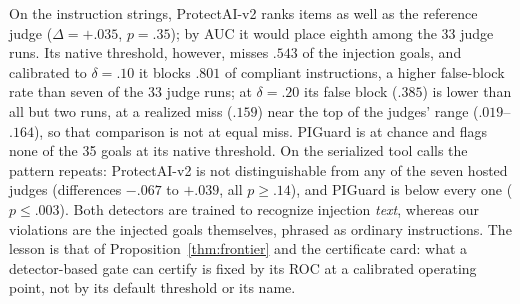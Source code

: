 On the instruction strings, ProtectAI-v2 ranks items as well as the reference judge
($\Delta=+.035$, $p=.35$); by AUC it would place eighth among the 33 judge runs. Its native
threshold, however, misses $.543$ of the injection goals, and calibrated to $\delta=.10$ it
blocks $.801$ of compliant instructions, a higher false-block rate than seven of the 33 judge runs; at $\delta=.20$ its
false block ($.385$) is lower than all but two runs, at a realized miss ($.159$) near the top of
the judges' range ($.019$--$.164$), so that comparison is not at equal miss. PIGuard is at chance
and flags none of the 35 goals at its native threshold. On the serialized tool calls the pattern
repeats: ProtectAI-v2 is not distinguishable from any of the seven hosted judges (differences
$-.067$ to $+.039$, all $p\ge.14$), and PIGuard is below every one ($p\le.003$). Both detectors
are trained to recognize injection \emph{text}, whereas our violations are the injected goals
themselves, phrased as ordinary instructions. The lesson is that of Proposition~\ref{thm:frontier}
and the certificate card: what a detector-based gate can certify is fixed by its ROC at a
calibrated operating point, not by its default threshold or its name.
